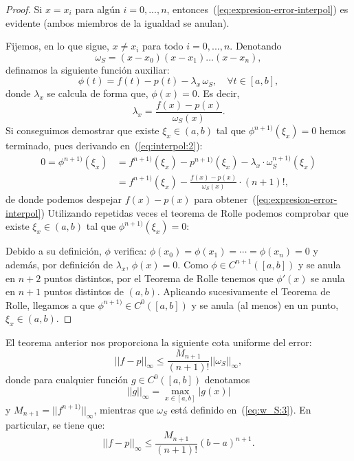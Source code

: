 \begin{proof}
  Si $x=x_i$ para algún $i=0,...,n$,
  entonces~(\ref{eq:expresion-error-interpol}) es evidente (ambos
  miembros de la igualdad se anulan).

  Fijemos, en lo que sigue, $x\neq x_i$ para todo $i=0,...,n$. Denotando
  \begin{equation}
  \omega_S=(x-x_0)(x-x_1)\dots (x-x_n),
 \label{eq:w_S:3} 
\end{equation}
  definamos la siguiente función auxiliar:
  \begin{equation}
    \phi(t)=f(t)-p(t)-\lambda_x\, \omega_S, \quad \forall t\in[a,b],
  \label{eq:interpol:2}
\end{equation}
  donde $\lambda_x$ se calcula de forma que, $\phi(x)=0$. Es
  decir,
  $$
  \lambda_x = \frac{f(x)-p(x)}{\omega_S(x)}.
  $$
  Si conseguimos demostrar que existe $\xi_x\in (a,b)$ tal que
  $\phi^{n+1)}(\xi_x)=0$ hemos terminado, pues derivando
  en~(\ref{eq:interpol:2}):
  \begin{align*}
    0=\phi^{n+1)}(\xi_x)&=f^{n+1)}(\xi_x)-p^{n+1)}(\xi_x)-\lambda_x\cdot\omega_S^{n+1)}(\xi_x)
    \\
    &=f^{n+1)}(\xi_x)- \frac{f(x)-p(x)}{\omega_S(x)}\cdot (n+1)!,
  \end{align*}
  de donde podemos despejar $f(x)-p(x)$ para
  obtener~(\ref{eq:expresion-error-interpol}) 
  Utilizando repetidas veces el teorema de Rolle podemos comprobar que
  existe $\xi_x\in (a,b)$ tal que $\phi^{n+1)}(\xi_x)=0$:

  Debido a su definición, $\phi$ verifica:
  $\phi(x_0)=\phi(x_1)=\cdots=\phi(x_n)=0$ y además, por definición de
  $\lambda_x$, $\phi(x)=0$. Como $\phi\in C^{n+1}([a,b])$ y se anula
  en $n+2$ puntos distintos, por el Teorema de Rolle tenemos que
  $\phi'(x)$ se anula en $n+1$ puntos distintos de $(a,b)$. Aplicando
  sucesivamente el Teorema de Rolle, llegamos a que $\phi^{n+1)}\in
  C^0([a,b])$ y se anula (al menos) en un punto, $\xi_x\in (a,b)$.
\end{proof}

\begin{remark}
  \label{rk:2}
  El teorema anterior nos proporciona la siguiente cota uniforme del
  error:
  \begin{equation*}
    ||f-p||_{\infty} \le \frac{M_{n+1}}{(n+1)!}||\omega_S||_\infty,
  \end{equation*}
  donde para cualquier función $g\in C^0([a,b])$ denotamos
  \begin{equation*}
    ||g||_\infty = \max_{x\in[a,b]} |g(x)|
  \end{equation*}
  y $M_{n+1}=||f^{n+1)}||_\infty$, mientras que $\omega_S$ está
  definido en~(\ref{eq:w_S:3}).
  En particular, se tiene que:
  \begin{equation*}
    ||f-p||_{\infty} \le \frac{M_{n+1}}{(n+1)!}(b-a)^{n+1}.
  \end{equation*}
  
\end{remark}
